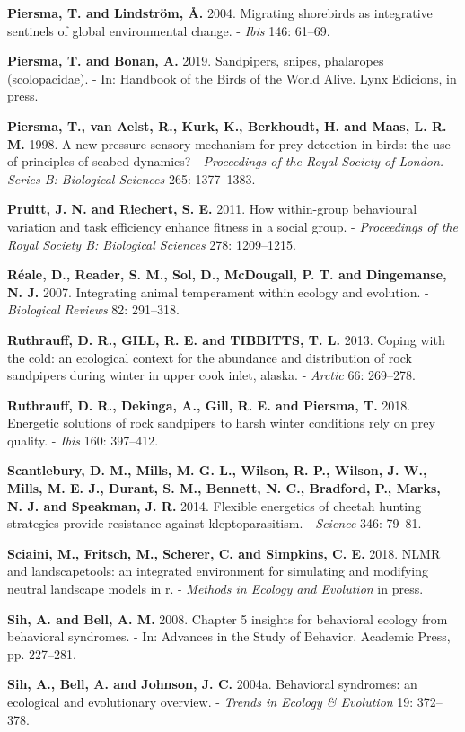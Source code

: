\documentclass[]{scrartcl}
\begin{document}
\begin{multicols}{2}
\textbf{Piersma, T. and Lindström, Å.} 2004. Migrating shorebirds as
integrative sentinels of global environmental change. - \emph{Ibis} 146:
61--69.

\textbf{Piersma, T. and Bonan, A.} 2019. Sandpipers, snipes, phalaropes
(scolopacidae). - In: Handbook of the Birds of the World Alive. Lynx
Edicions, in press.

\textbf{Piersma, T., van Aelst, R., Kurk, K., Berkhoudt, H. and Maas, L.
R. M.} 1998. A new pressure sensory mechanism for prey detection in
birds: the use of principles of seabed dynamics? - \emph{Proceedings of
the Royal Society of London. Series B: Biological Sciences} 265:
1377--1383.

\textbf{Pruitt, J. N. and Riechert, S. E.} 2011. How within-group
behavioural variation and task efficiency enhance fitness in a social
group. - \emph{Proceedings of the Royal Society B: Biological Sciences}
278: 1209--1215.

\textbf{Réale, D., Reader, S. M., Sol, D., McDougall, P. T. and
Dingemanse, N. J.} 2007. Integrating animal temperament within ecology
and evolution. - \emph{Biological Reviews} 82: 291--318.

\textbf{Ruthrauff, D. R., GILL, R. E. and TIBBITTS, T. L.} 2013. Coping
with the cold: an ecological context for the abundance and distribution
of rock sandpipers during winter in upper cook inlet, alaska. -
\emph{Arctic} 66: 269--278.

\textbf{Ruthrauff, D. R., Dekinga, A., Gill, R. E. and Piersma, T.}
2018. Energetic solutions of rock sandpipers to harsh winter conditions
rely on prey quality. - \emph{Ibis} 160: 397--412.

\textbf{Scantlebury, D. M., Mills, M. G. L., Wilson, R. P., Wilson, J.
W., Mills, M. E. J., Durant, S. M., Bennett, N. C., Bradford, P., Marks,
N. J. and Speakman, J. R.} 2014. Flexible energetics of cheetah hunting
strategies provide resistance against kleptoparasitism. - \emph{Science}
346: 79--81.

\textbf{Sciaini, M., Fritsch, M., Scherer, C. and Simpkins, C. E.} 2018.
NLMR and landscapetools: an integrated environment for simulating and
modifying neutral landscape models in r. - \emph{Methods in Ecology and
Evolution} in press.

\textbf{Sih, A. and Bell, A. M.} 2008. Chapter 5 insights for behavioral
ecology from behavioral syndromes. - In: Advances in the Study of
Behavior. Academic Press, pp. 227--281.

\textbf{Sih, A., Bell, A. and Johnson, J. C.} 2004a. Behavioral
syndromes: an ecological and evolutionary overview. - \emph{Trends in
Ecology \& Evolution} 19: 372--378.


\end{multicols}
\end{document}
